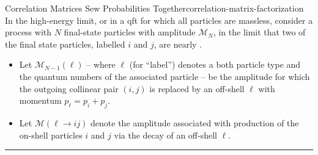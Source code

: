 \begin{proposition}{Correlation Matrices Sew Probabilities Together}{correlation-matrix-factorization}
    In the high-energy limit, or in a \gls{qft} for which all particles are massless, consider a process with \(N\) final-state particles with amplitude \(\mathcal{M}_N\), in the limit that two of the final state particles, labelled \(i\) and \(j\), are nearly .

    \begin{itemize}
    \item
    Let \(\mathcal{M}_{N-1}(\ell)\) -- where \(\ell\) (for ``label'') denotes a both particle type and the quantum numbers of the associated particle -- be the amplitude for which the outgoing collinear pair \((i,j)\) is replaced by an off-shell \(\ell\) with momentum \(p_\ell = p_i + p_j\).


    \item
    Let \(\mathcal{M}(\ell\to ij)\) denote the amplitude associated with production of the on-shell particles \(i\) and \(j\) via the decay of an off-shell \(\ell\).
    \end{itemize}

    \vspace{7pt}
    \hrule
    \vspace{7pt}


\end{proposition}
